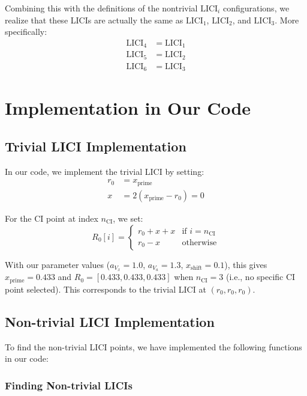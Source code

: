 \documentclass{article}
\begin{document}
Combining this with the definitions of the nontrivial $\text{LICI}_i$ configurations, we realize that these LICIs are actually the same as $\text{LICI}_1$, $\text{LICI}_2$, and $\text{LICI}_3$. More specifically:
\begin{align}
\text{LICI}_4 &= \text{LICI}_1 \\
\text{LICI}_5 &= \text{LICI}_2 \\
\text{LICI}_6 &= \text{LICI}_3
\end{align}

\section{Implementation in Our Code}

\subsection{Trivial LICI Implementation}

In our code, we implement the trivial LICI by setting:
\begin{align}
r_0 &= x_{\text{prime}} \\
x &= 2(x_{\text{prime}} - r_0) = 0
\end{align}

For the CI point at index $n_{\text{CI}}$, we set:
\begin{equation}
R_0[i] = 
\begin{cases}
r_0 + x + x & \text{if } i = n_{\text{CI}} \\
r_0 - x & \text{otherwise}
\end{cases}
\end{equation}

With our parameter values ($a_{V_x} = 1.0$, $a_{V_a} = 1.3$, $x_{\text{shift}} = 0.1$), this gives $x_{\text{prime}} = 0.433$ and $R_0 = [0.433, 0.433, 0.433]$ when $n_{\text{CI}} = 3$ (i.e., no specific CI point selected). This corresponds to the trivial LICI at $(r_0, r_0, r_0)$.

\subsection{Non-trivial LICI Implementation}

To find the non-trivial LICI points, we have implemented the following functions in our code:

\subsubsection{Finding Non-trivial LICIs}
\end{document}
